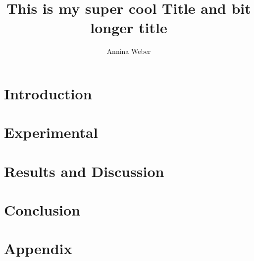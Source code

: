 \documentclass{UZHBT}
\title{This is my super cool Title and bit longer title}
\author{Annina Weber}
\begin{document}
\maketitle
\newpage

\section*{Introduction}

\section*{Experimental}

\section*{Results and Discussion}

\section*{Conclusion}

\printbibliography

\appendix
  \section*{Appendix}
  \renewcommand\thefigure{A\arabic{figure}} %
  \renewcommand\thetable{A\arabic{table}} %
  \renewcommand\theequation{A\arabic{equation}} %
  \setcounter{figure}{0}
  \setcounter{table}{0}
  \setcounter{equation}{0}

\end{document}
